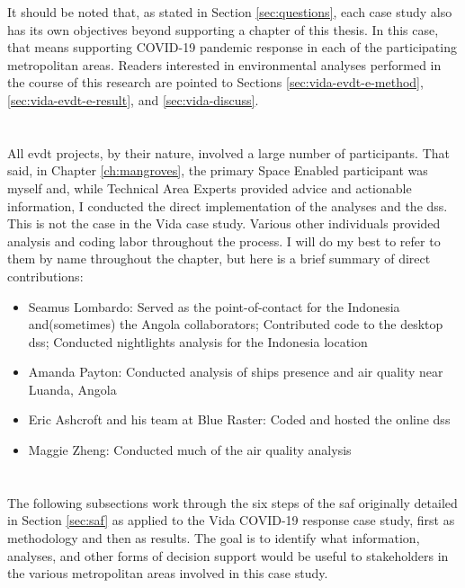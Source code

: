It should be noted that, as stated in Section \ref{sec:questions}, each case study also has its own objectives beyond supporting a chapter of this thesis. In this case, that means supporting COVID-19 pandemic response in each of the participating metropolitan areas. Readers interested in environmental analyses performed in the course of this research are pointed to Sections \ref{sec:vida-evdt-e-method}, \ref{sec:vida-evdt-e-result}, and \ref{sec:vida-discuss}.

\section{}

All \ac{evdt} projects, by their nature, involved a large number of participants. That said, in Chapter \ref{ch:mangroves}, the primary Space Enabled participant was myself and, while Technical Area Experts provided advice and actionable information, I conducted the direct implementation of the analyses and the \ac{dss}. This is not the case in the Vida case study. Various other individuals provided analysis and coding labor throughout the process. I will do my best to refer to them by name throughout the chapter, but here is a brief summary of direct contributions:

\begin{itemize}[itemsep=0pt,parsep=0pt]
	\item{Seamus Lombardo: Served as the point-of-contact for the Indonesia and(sometimes) the Angola collaborators; Contributed code to the desktop \ac{dss}; Conducted nightlights analysis for the Indonesia location}
	\item{Amanda Payton: Conducted analysis of ships presence and air quality near Luanda, Angola}
	\item{Eric Ashcroft and his team at Blue Raster: Coded and hosted the online \ac{dss}}
	\item{Maggie Zheng: Conducted much of the air quality analysis}
\end{itemize}


\section{} \label{sec:vida-saf}

The following subsections work through the six steps of the \ac{saf} originally detailed in Section \ref{sec:saf} as applied to the Vida COVID-19 response case study, first as methodology and then as results. The goal is to identify what information, analyses, and other forms of decision support would be useful to stakeholders in the various metropolitan areas involved in this case study.

